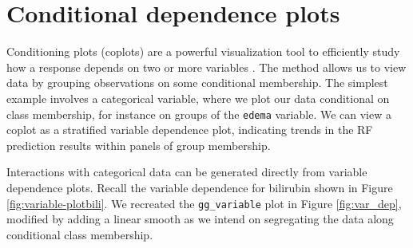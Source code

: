 \documentclass[article, nojss]{jss}
\begin{document}
\section{Conditional dependence
plots}\label{conditional-dependence-plots}

Conditioning plots (coplots) \citep{chambers:1992,cleveland:1993} are a
powerful visualization tool to efficiently study how a response depends
on two or more variables \citep{cleveland:1993}. The method allows us to
view data by grouping observations on some conditional membership. The
simplest example involves a categorical variable, where we plot our data
conditional on class membership, for instance on groups of the
\texttt{edema} variable. We can view a coplot as a stratified variable
dependence plot, indicating trends in the RF prediction results within
panels of group membership.

Interactions with categorical data can be generated directly from
variable dependence plots. Recall the variable dependence for bilirubin
shown in Figure \ref{fig:variable-plotbili}. We recreated the
\texttt{gg\_variable} plot in Figure \ref{fig:var_dep}, modified by
adding a linear smooth as we intend on segregating the data along
conditional class membership.
\end{document}
